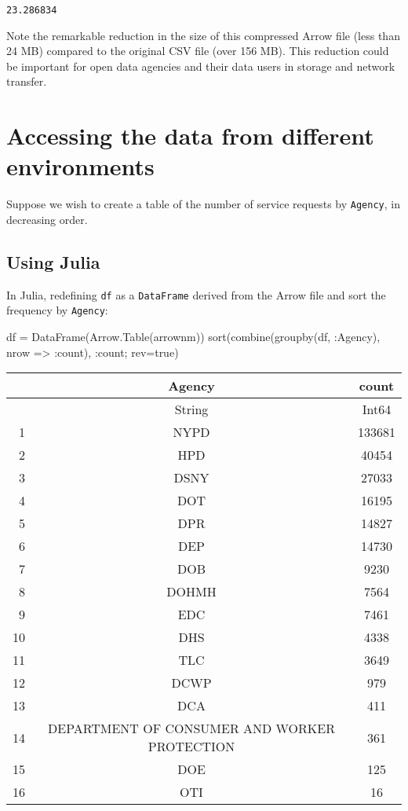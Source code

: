 \documentclass[
  12pt]{article}
\newenvironment{Shaded}{\begin{snugshade}}{\end{snugshade}}
\newcommand{\ConstantTok}[1]{\textcolor[rgb]{0.56,0.35,0.01}{#1}}
\newcommand{\FunctionTok}[1]{\textcolor[rgb]{0.28,0.35,0.67}{#1}}
\newcommand{\NormalTok}[1]{\textcolor[rgb]{0.00,0.23,0.31}{#1}}
\newcommand{\OperatorTok}[1]{\textcolor[rgb]{0.37,0.37,0.37}{#1}}
\begin{document}
\begin{verbatim}
23.286834
\end{verbatim}

Note the remarkable reduction in the size of this compressed Arrow file
(less than 24 MB) compared to the original CSV file (over 156 MB). This
reduction could be important for open data agencies and their data users
in storage and network transfer.

\section{Accessing the data from different
environments}\label{sec-accessing}

Suppose we wish to create a table of the number of service requests by
\texttt{Agency}, in decreasing order.

\subsection{Using Julia}\label{using-julia}

In Julia, redefining \texttt{df} as a \texttt{DataFrame} derived from
the Arrow file and sort the frequency by \texttt{Agency}:

\begin{Shaded}
\begin{Highlighting}[]
\NormalTok{df }\OperatorTok{=} \FunctionTok{DataFrame}\NormalTok{(Arrow.}\FunctionTok{Table}\NormalTok{(arrownm))}
\FunctionTok{sort}\NormalTok{(}\FunctionTok{combine}\NormalTok{(}\FunctionTok{groupby}\NormalTok{(df, }\OperatorTok{:}\NormalTok{Agency), nrow }\OperatorTok{=\textgreater{}} \OperatorTok{:}\NormalTok{count), }\OperatorTok{:}\NormalTok{count; rev}\OperatorTok{=}\ConstantTok{true}\NormalTok{)}
\end{Highlighting}
\end{Shaded}

\begin{tabular}{r|cc}
    & Agency & count\\
    \hline
    & String & Int64\\
    \hline
    1 & NYPD & 133681 \\
    2 & HPD & 40454 \\
    3 & DSNY & 27033 \\
    4 & DOT & 16195 \\
    5 & DPR & 14827 \\
    6 & DEP & 14730 \\
    7 & DOB & 9230 \\
    8 & DOHMH & 7564 \\
    9 & EDC & 7461 \\
    10 & DHS & 4338 \\
    11 & TLC & 3649 \\
    12 & DCWP & 979 \\
    13 & DCA & 411 \\
    14 & DEPARTMENT OF CONSUMER AND WORKER PROTECTION & 361 \\
    15 & DOE & 125 \\
    16 & OTI & 16 \\
\end{tabular}
\end{document}
